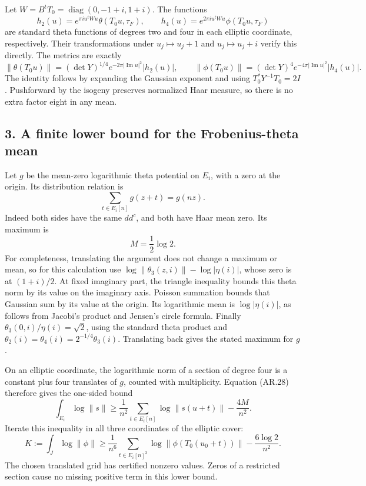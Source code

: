 \documentclass[11pt,a4paper]{article}
\begin{document}
Let \(W=B^tT_0=\operatorname{diag}(0,-1+i,1+i)\). The functions \[
h_2(u)=e^{\pi i u^tWu}\theta(T_0u,\tau_F),\qquad
h_4(u)=e^{2\pi i u^tWu}\phi(T_0u,\tau_F)
\] are standard theta functions of degrees two and four in each elliptic
coordinate, respectively. Their transformations under
\(u_j\mapsto u_j+1\) and \(u_j\mapsto u_j+i\) verify this directly. The
metrics are exactly \[
\|\theta(T_0u)\|=(\det Y)^{1/4}
 e^{-2\pi|\operatorname{Im}u|^2}|h_2(u)|,\qquad
\|\phi(T_0u)\|=(\det Y)^4
 e^{-4\pi|\operatorname{Im}u|^2}|h_4(u)|.
\tag{AR.27}
\] The identity follows by expanding the Gaussian exponent and using
\(T_0^*Y^{-1}T_0=2I\). Pushforward by the isogeny preserves normalized
Haar measure, so there is no extra factor eight in any mean.

\subsection{3. A finite lower bound for the Frobenius-theta
mean}\label{a-finite-lower-bound-for-the-frobenius-theta-mean}

Let \(g\) be the mean-zero logarithmic theta potential on \(E_i\), with
a zero at the origin. Its distribution relation is \[
\sum_{t\in E_i[n]}g(z+t)=g(nz).
\tag{AR.28}
\] Indeed both sides have the same \(dd^c\), and both have Haar mean
zero. Its maximum is \[
M=\frac12\log2.
\] For completeness, translating the argument does not change a maximum
or mean, so for this calculation use
\(\log\|\theta_3(z,i)\|-\log|\eta(i)|\), whose zero is at \((1+i)/2\).
At fixed imaginary part, the triangle inequality bounds this theta norm
by its value on the imaginary axis. Poisson summation bounds that
Gaussian sum by its value at the origin. Its logarithmic mean is
\(\log|\eta(i)|\), as follows from Jacobi's product and Jensen's circle
formula. Finally \(\theta_3(0,i)/\eta(i)=\sqrt2\), using the standard
theta product and \(\theta_2(i)=\theta_4(i)=2^{-1/4}\theta_3(i)\).
Translating back gives the stated maximum for \(g\).

On an elliptic coordinate, the logarithmic norm of a section of degree
four is a constant plus four translates of \(g\), counted with
multiplicity. Equation (AR.28) therefore gives the one-sided bound \[
\int_{E_i}\log\|s\|
\ge\frac1{n^2}\sum_{t\in E_i[n]}\log\|s(u+t)\|
       -\frac{4M}{n^2}.
\] Iterate this inequality in all three coordinates of the elliptic
cover: \[
K:=\int_J\log\|\phi\|
\ge\frac1{n^6}\sum_{t\in E_i[n]^3}
           \log\|\phi(T_0(u_0+t))\|
       -\frac{6\log2}{n^2}.
\tag{AR.29}
\] The chosen translated grid has certified nonzero values. Zeros of a
restricted section cause no missing positive term in this lower bound.
\end{document}
